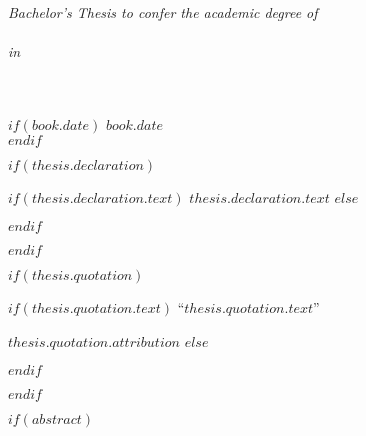 \begin{titlepage}
\begin{center}
\vfill

\large \textit{Bachelor's Thesis to confer the academic degree of\\ \degreename}\\[0.3cm] %
\textit{in}\\[0.4cm]
\textbf{\groupname}\\
\href{$thesis.supervisor.url$}{\deptname}\\[2cm] %

\vfill

$if(book.date)$
{\large $book.date$}\\[4cm] %
$endif$

\vfill
\end{center}
\end{titlepage}


$if(thesis.declaration)$
\begin{declaration}
\addchaptertocentry{\authorshipname} %
$if(thesis.declaration.text)$
$thesis.declaration.text$
$else$

$endif$

\end{declaration}

\cleardoublepage
$endif$

$if(thesis.quotation)$

\vspace*{0.2\textheight}

$if(thesis.quotation.text)$
\noindent``{\itshape $thesis.quotation.text$}''\bigbreak

\hfill $thesis.quotation.attribution$
$else$

$endif$

$endif$

$if(abstract)$

\begin{abstract}
\addchaptertocentry{\abstractname} %
$abstract$
\end{abstract}

